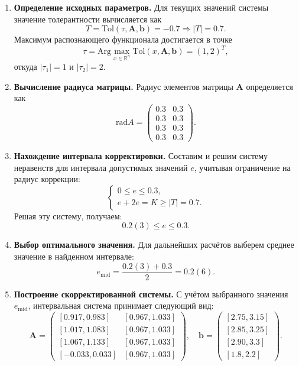 \documentclass{article}
\begin{document}
    \begin{enumerate}
      \item \textbf{Определение исходных параметров.} Для текущих значений системы значение толерантности вычисляется как 
      \[
      T = \text{Tol}(\tau, \mathbf{A}, \mathbf{b}) = -0.7 \Rightarrow |T| = 0.7.
      \]
      Максимум распознающего функционала достигается в точке 
      \[
      \tau = \text{Arg} \max_{x \in \mathbb{R}^n} \text{Tol}(x, \mathbf{A}, \mathbf{b}) = (1, 2)^T,
      \]
      откуда \( |\tau_1| = 1 \) и \( |\tau_2| = 2 \).
      
      \item \textbf{Вычисление радиуса матрицы.} Радиус элементов матрицы \(\mathbf{A}\) определяется как 
      \[
      \text{rad} A = \begin{pmatrix}
          0.3 & 0.3 \\
          0.3 & 0.3 \\
          0.3 & 0.3 \\
          0.3 & 0.3
      \end{pmatrix}.
      \]
    
      \item \textbf{Нахождение интервала корректировки.} Составим и решим систему неравенств для интервала допустимых значений \( e \), учитывая ограничение на радиус коррекции:
      \[
      \begin{cases}
        0 \leqslant e \leqslant 0.3, \\
        e + 2e = K \geqslant |T| = 0.7.
      \end{cases}
      \]
      Решая эту систему, получаем:
      \[
      0.2(3) \leqslant e \leqslant 0.3.
      \]
    
      \item \textbf{Выбор оптимального значения.} Для дальнейших расчётов выберем среднее значение в найденном интервале:
      \[
      e_{\text{mid}} = \frac{0.2(3) + 0.3}{2} = 0.2(6).
      \]
    
      \item \textbf{Построение скорректированной системы.} С учётом выбранного значения \( e_{\text{mid}} \), интервальная система принимает следующий вид:
      \[
      \mathbf{A} = \begin{pmatrix}
          [0.917, 0.983] & [0.967, 1.033] \\
          [1.017, 1.083] & [0.967, 1.033] \\
          [1.067, 1.133] & [0.967, 1.033] \\
          [-0.033, 0.033] & [0.967, 1.033]
      \end{pmatrix}, \quad
      \mathbf{b} = \begin{pmatrix}
          [2.75, 3.15] \\
          [2.85, 3.25] \\
          [2.90, 3.3] \\
          [1.8, 2.2]
      \end{pmatrix}.
      \]
    \end{enumerate}
\end{document}

